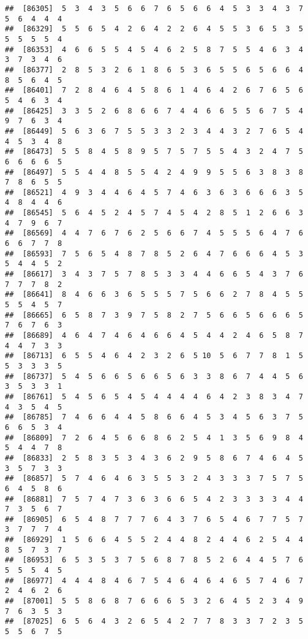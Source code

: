 \documentclass[
]{book}
\begin{document}
\begin{verbatim}
##  [86305]  5  3  4  3  5  6  6  7  6  5  6  6  4  5  3  3  4  3  7  5  6  4  4  4
##  [86329]  5  5  6  5  4  2  6  4  2  2  6  4  5  5  3  6  5  3  5  5  5  5  5  4
##  [86353]  4  6  6  5  5  4  5  4  6  2  5  8  7  5  5  4  6  3  4  3  7  3  4  6
##  [86377]  2  8  5  3  2  6  1  8  6  5  3  6  5  5  6  5  6  6  4  8  5  6  4  5
##  [86401]  7  2  8  4  6  4  5  8  6  1  4  6  4  2  6  7  6  5  6  5  4  6  3  4
##  [86425]  3  3  5  2  6  8  6  6  7  4  4  6  6  5  5  6  7  5  4  9  7  6  3  4
##  [86449]  5  6  3  6  7  5  5  3  3  2  3  4  4  3  2  7  6  5  4  4  5  3  4  8
##  [86473]  5  5  8  4  5  8  9  5  7  5  7  5  5  4  3  2  4  7  5  6  6  6  6  5
##  [86497]  5  5  4  4  8  5  5  4  2  4  9  9  5  5  6  3  8  3  8  7  8  6  5  5
##  [86521]  4  9  3  4  4  6  4  5  7  4  6  3  6  3  6  6  6  3  5  4  8  4  4  6
##  [86545]  5  6  4  5  2  4  5  7  4  5  4  2  8  5  1  2  6  6  3  4  7  9  6  7
##  [86569]  4  4  7  6  7  6  2  5  6  6  7  4  5  5  5  6  4  7  6  6  6  7  7  8
##  [86593]  7  5  6  5  4  8  7  8  5  2  6  4  7  6  6  6  4  5  3  5  4  4  5  2
##  [86617]  3  4  3  7  5  7  8  5  3  3  4  4  6  6  5  4  3  7  6  7  7  7  8  2
##  [86641]  8  4  6  6  3  6  5  5  5  7  5  6  6  2  7  8  4  5  5  5  5  4  5  7
##  [86665]  6  5  8  7  3  9  7  5  8  2  7  5  6  6  5  6  6  6  5  7  6  7  6  3
##  [86689]  4  6  4  7  4  6  4  6  6  4  5  4  4  2  4  6  5  8  7  4  4  7  3  3
##  [86713]  6  5  5  4  6  4  2  3  2  6  5 10  5  6  7  7  8  1  5  5  3  3  3  5
##  [86737]  5  4  5  6  6  5  6  6  5  6  3  3  8  6  7  4  4  5  6  3  5  3  3  1
##  [86761]  5  4  5  6  5  4  5  4  4  4  4  6  4  2  3  8  3  4  7  4  3  5  4  5
##  [86785]  7  4  6  6  4  4  5  8  6  6  4  5  3  4  5  6  3  7  5  6  6  5  3  4
##  [86809]  7  2  6  4  5  6  6  8  6  2  5  4  1  3  5  6  9  8  4  5  4  4  7  8
##  [86833]  2  5  8  3  5  3  4  3  6  2  9  5  8  6  7  4  6  4  5  3  5  7  3  3
##  [86857]  5  7  4  6  4  6  3  5  5  3  2  4  3  3  3  7  5  7  5  6  4  5  8  6
##  [86881]  7  5  7  4  7  3  6  3  6  6  5  4  2  3  3  3  3  4  4  7  3  5  6  7
##  [86905]  6  5  4  8  7  7  7  6  4  3  7  6  5  4  6  7  7  5  7  3  7  7  7  4
##  [86929]  1  5  6  6  4  5  5  2  4  4  8  2  4  4  6  2  5  4  4  8  5  7  3  7
##  [86953]  6  5  3  5  3  7  5  6  8  7  8  5  2  6  4  4  5  7  6  5  5  5  4  5
##  [86977]  4  4  4  8  4  6  7  5  4  6  4  6  4  6  5  7  4  6  7  2  4  6  2  6
##  [87001]  5  5  8  6  8  7  6  6  6  5  3  2  6  4  5  2  3  4  9  7  6  3  5  3
##  [87025]  6  5  6  4  3  2  6  5  4  2  7  7  8  3  3  7  2  3  5  5  5  6  7  5

\end{verbatim}
\end{document}
